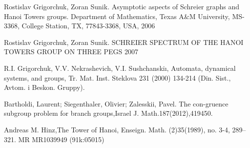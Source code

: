 \documentclass[a4paper,12pt]{amsart}
\begin{document}
\begin{thebibliography}{9}
	Rostislav Grigorchuk, Zoran Sunik. Asymptotic aspects of Schreier graphs and Hanoi Towers groups. Department of Mathematics, Texas A\&M University, MS-3368, College Station, TX, 77843-3368, USA, 2006
	
	Rostislav Grigorchuk, Zoran Sunik. SCHREIER SPECTRUM OF THE HANOI TOWERS GROUP ON THREE PEGS 2007
	
	R.I. Grigorchuk, V.V. Nekrashevich, V.I. Sushchanskiı, Automata, dynamical systems, and groups, Tr. Mat. Inst. Steklova 231 (2000) 134-214
	(Din. Sist., Avtom. i Beskon. Gruppy).
	
	Bartholdi, Laurent; Siegenthaler, Olivier; Zalesskii, Pavel. The con-gruence subgroup problem for branch groups,Israel  J.  Math.187(2012),419450.
	
	 Andreas M. Hinz,The Tower of Hanoi, Enseign. Math. (2)35(1989), 
	no. 3-4, 289–321. MR MR1039949 (91k:05015)
	
\end{thebibliography}

\newpage
\thispagestyle {empty}
\end{document}

